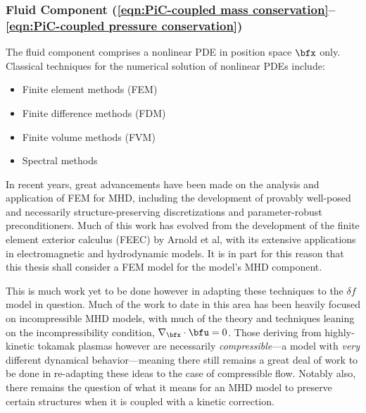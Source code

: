 \subsubsection*{Fluid Component (\ref{eqn:PiC-coupled mass conservation}--\ref{eqn:PiC-coupled pressure conservation})}
    The fluid component comprises a nonlinear PDE in position space $\bfx$ only. Classical techniques for the numerical solution of nonlinear PDEs include:
    \begin{itemize}
        \item  Finite element methods (FEM)
        \item  Finite difference methods (FDM)
        \item  Finite volume methods (FVM)
        \item  Spectral methods
    \end{itemize}
    In recent years, great advancements have been made on the analysis and application of FEM for MHD, including the development of provably well-posed and necessarily structure-preserving discretizations and parameter-robust preconditioners. \cite{Hu_Xu_2015, Hu_Ma_Yu_2017, Hu_Lee_Xu_2021, Green_et_al_2022, LFM22, LHF22} Much of this work has evolved from the development of the finite element exterior calculus (FEEC) by Arnold et al, with its extensive applications in electromagnetic and hydrodynamic models. \cite{Arnold_Falk_Winther_2006, Arnold_Falk_Winther_2009, Arnold_2018} It is in part for this reason that this thesis shall consider a FEM model for the model's MHD component. 

    This is much work yet to be done however in adapting these techniques to the $\delta\! f$ model in question. Much of the work to date in this area has been heavily focused on incompressible MHD models, with much of the theory and techniques leaning on the incompressibility condition, $\nabla_{\bfx}\cdot\bfu  =  0$. Those deriving from highly-kinetic tokamak plasmas however are necessarily \emph{compressible}---a model with \emph{very} different dynamical behavior---meaning there still remains a great deal of work to be done in re-adapting these ideas to the case of compressible flow. Notably also, there remains the question of what it means for an MHD model to preserve certain structures when it is coupled with a kinetic correction.
    
